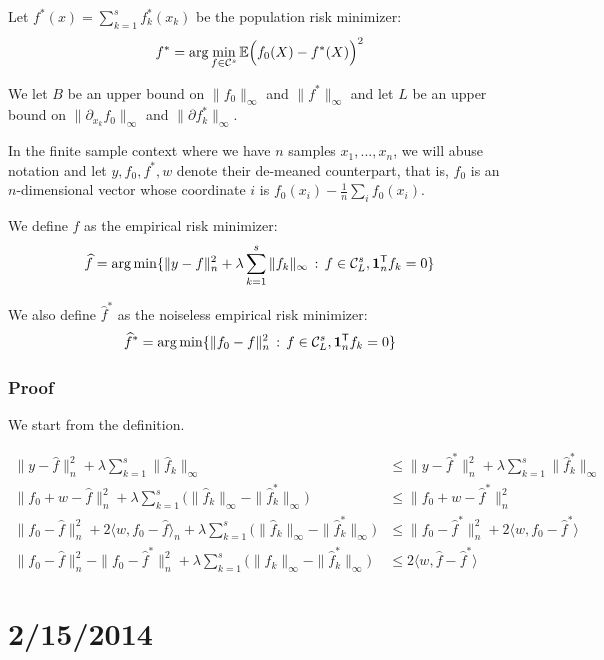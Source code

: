 \documentclass{article}
\begin{document}
Let $f^*(x) = \sum_{k=1}^s f^*_k(x_k)$ be the population risk minimizer:
\[
f^* = \arg\min_{f \in \mathcal{C}^s} \mathbb{E} \Big( f_0(X) - f^*(X) \Big)^2
\]

We let $B$ be an upper bound on $\|f_0\|_\infty$ and $\| f^* \|_\infty$ and let $L$ be an upper bound on $\| \partial_{x_k} f_0 \|_\infty$ and $\| \partial f^*_k \|_\infty$.

In the finite sample context where we have $n$ samples $x_1, ..., x_n$, we will abuse notation and let $y, f_0, f^*, w$ denote their de-meaned counterpart, that is, $f_0$ is an $n$-dimensional vector whose coordinate $i$ is $f_0(x_i) - \frac{1}{n} \sum_i f_0(x_i)$. 

We define $\hat{f}$ as the empirical risk minimizer:
\[
\widehat{f} = \arg\min \{ \| y - f \|_n^2 + \lambda \sum_{k=1}^s \| f_k \|_\infty 
    \,:\, f \in \mathcal{C}^s_L, \mathbf{1}_n^{\mathsf{T}} f_k = 0 \}
\]

We also define $\hat{f}^*$ as the noiseless empirical risk minimizer:
\[
\widehat{f}^* = \arg\min \{ \| f_0 - f \|_n^2 \,:\, 
f \in \mathcal{C}^s_L, \mathbf{1}_n^{\mathsf{T}} f_k = 0\}
\]

\subsubsection{Proof}

We start from the definition.

\begin{align*}
\| y - \hat{f} \|_n^2 + \lambda \sum_{k=1}^s \| \hat{f}_k \|_\infty &\leq
  \| y - \hat{f}^* \|_n^2 + \lambda \sum_{k=1}^s \| \hat{f}^*_k \|_\infty \\
\| f_0 + w - \hat{f} \|_n^2 + \lambda \sum_{k=1}^s \Big( \| \hat{f}_k \|_\infty - 
    \| \hat{f}^*_k \|_\infty \Big) &\leq \|f_0 + w - \hat{f}^* \|_n^2 \\
\| f_0 - \hat{f} \|_n^2 + 2\langle w, f_0 - \hat{f} \rangle_n 
     +  \lambda \sum_{k=1}^s \Big( \| \hat{f}_k \|_\infty - 
    \| \hat{f}^*_k \|_\infty \Big) &\leq \| f_0 - \hat{f}^* \|_n^2 + 
    2 \langle w, f_0 - \hat{f}^* \rangle \\
\|f_0 - \hat{f} \|_n^2 - \| f_0 - \hat{f}^* \|_n^2 + 
    \lambda \sum_{k=1}^s \Big( \| \hat{f}_k \|_\infty - 
    \| \hat{f}^*_k \|_\infty \Big) &\leq 2 \langle w, \hat{f} - \hat{f}^* \rangle
\end{align*}



\newpage

\section{2/15/2014}
\end{document}
